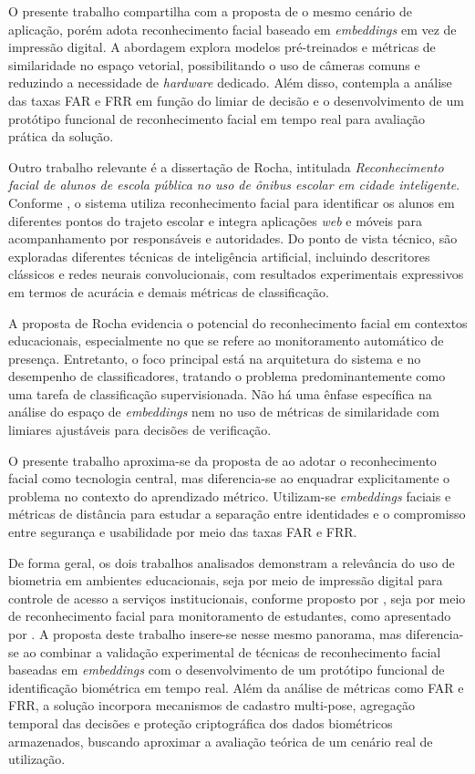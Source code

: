 O presente trabalho compartilha com a proposta de \textcite{silvajunior2025} o mesmo cenário de aplicação, porém adota reconhecimento facial baseado em \textit{embeddings} em vez de impressão digital. A abordagem explora modelos pré-treinados e métricas de similaridade no espaço vetorial, possibilitando o uso de câmeras comuns e reduzindo a necessidade de \textit{hardware} dedicado. Além disso, contempla a análise das taxas \acs{FAR} e \acs{FRR} em função do limiar de decisão e o desenvolvimento de um protótipo funcional de reconhecimento facial em tempo real para avaliação prática da solução.

Outro trabalho relevante é a dissertação de Rocha, intitulada \textit{Reconhecimento facial de alunos de escola pública no uso de ônibus escolar em cidade inteligente}. Conforme \textcite{rocha2023}, o sistema utiliza reconhecimento facial para identificar os alunos em diferentes pontos do trajeto escolar e integra aplicações \textit{web} e móveis para acompanhamento por responsáveis e autoridades. Do ponto de vista técnico, são exploradas diferentes técnicas de inteligência artificial, incluindo descritores clássicos e redes neurais convolucionais, com resultados experimentais expressivos em termos de acurácia e demais métricas de classificação.

A proposta de Rocha \cite{rocha2023} evidencia o potencial do reconhecimento facial em contextos educacionais, especialmente no que se refere ao monitoramento automático de presença. Entretanto, o foco principal está na arquitetura do sistema e no desempenho de classificadores, tratando o problema predominantemente como uma tarefa de classificação supervisionada. Não há uma ênfase específica na análise do espaço de \textit{embeddings} nem no uso de métricas de similaridade com limiares ajustáveis para decisões de verificação.

O presente trabalho aproxima-se da proposta de \textcite{rocha2023} ao adotar o reconhecimento facial como tecnologia central, mas diferencia-se ao enquadrar explicitamente o problema no contexto do aprendizado métrico. Utilizam-se \textit{embeddings} faciais e métricas de distância para estudar a separação entre identidades e o compromisso entre segurança e usabilidade por meio das taxas \acs{FAR} e \acs{FRR}.

De forma geral, os dois trabalhos analisados demonstram a relevância do uso de biometria em ambientes educacionais, seja por meio de impressão digital para controle de acesso a serviços institucionais, conforme proposto por \textcite{silvajunior2025}, seja por meio de reconhecimento facial para monitoramento de estudantes, como apresentado por \textcite{rocha2023}. A proposta deste trabalho insere-se nesse mesmo panorama, mas diferencia-se ao combinar a validação experimental de técnicas de reconhecimento facial baseadas em \textit{embeddings} com o desenvolvimento de um protótipo funcional de identificação biométrica em tempo real. Além da análise de métricas como \acs{FAR} e \acs{FRR}, a solução incorpora mecanismos de cadastro multi-pose, agregação temporal das decisões e proteção criptográfica dos dados biométricos armazenados, buscando aproximar a avaliação teórica de um cenário real de utilização.

